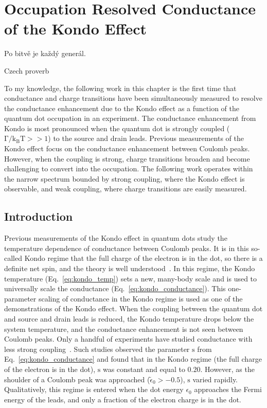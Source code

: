 \chapter[Occupation Resolved Conductance of the Kondo Effect]{Occupation Resolved Conductance of the Kondo Effect}\label{cha:mixed_valence_conductance}

\epigraph{Po bitvě je každý generál.}{Czech proverb}%

\noindent To my knowledge, the following work in this chapter is the first time that conductance and charge transitions have been simultaneously measured to resolve the conductance enhancement due to the Kondo effect as a function of the quantum dot occupation in an experiment. The conductance enhancement from Kondo is most pronounced when the quantum dot is strongly coupled ($\mathrm{\Gamma/k_BT}>>1$) to the source and drain leads. Previous measurements of the Kondo effect focus on the conductance enhancement between Coulomb peaks. However, when the coupling is strong, charge transitions broaden and become challenging to convert into the occupation. 
The following work operates within the narrow spectrum bounded by strong coupling, where the Kondo effect is observable, and weak coupling, where charge transitions are easily measured. 


\section{Introduction}
Previous measurements of the Kondo effect in quantum dots study the temperature dependence of conductance between Coulomb peaks. It is in this so-called Kondo regime that the full charge of the electron is in the dot, so there is a definite net spin, and the theory is well understood~\cite{costi_kondo_mv_eo_regime, kondo_unitary}. In this regime, the Kondo temperature (Eq.~\ref{eq:kondo_temp}) sets a new, many-body scale and is used to universally scale the conductance (Eq.~\ref{eq:kondo_conductance}). This one-parameter scaling of conductance in the Kondo regime is used as one of the demonstrations of the Kondo effect. When the coupling between the quantum dot and source and drain leads is reduced, the Kondo temperature drops below the system temperature, and the conductance enhancement is not seen between Coulomb peaks. Only a handful of experiments have studied conductance with less strong coupling~\cite{goldhaber_mv}. Such studies observed the parameter $\mathrm{s}$ from Eq.~\ref{eq:kondo_conductance} and found that in the Kondo regime (the full charge of the electron is in the dot), $\mathrm{s}$ was constant and equal to $0.20$. However, as the shoulder of a Coulomb peak was approached ($\tilde{\epsilon}_0>-0.5$), $\mathrm{s}$ varied rapidly. Qualitatively, this regime is entered when the dot energy $\epsilon_0$ approaches the Fermi energy of the leads, and only a fraction of the electron charge is in the dot. 


